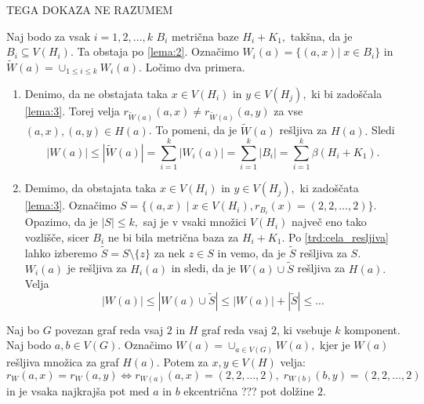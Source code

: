 \documentclass[mat1, tisk]{fmfdelo}
\newcommand{\1}{(1, 1, \ldots, 1)}
\newcommand{\2}{(2, 2, \ldots, 2)}
\begin{document}
TEGA DOKAZA NE RAZUMEM

\begin{dokaz}
    Naj bodo za vsak $i = 1, 2, \ldots, k$ $B_i$ metrična baze $H_i + K_1,$ takšna, da je $B_i \subseteq V(H_i).$ 
    Ta obstaja po \ref{lema:2}. Označimo $W_i(a) = \{(a,x) | \; x \in B_i\}$ in $\widetilde{W}(a) = \cup_{1 \leq i \leq k} W_i(a)$.
    Ločimo dva primera.
    \begin{enumerate}
        \item Denimo, da ne obstajata taka $x \in V(H_i)$ in $y\in V(H_j),$ ki bi zadoščala \ref{lema:3}.
        Torej velja $r_{\widetilde{W}(a)}(a, x) \neq r_{\widetilde{W}(a)}(a, y)$ za vse $(a, x), (a, y) \in H(a)$.
        To pomeni, da je $\widetilde{W}(a)$ rešljiva za $H(a).$ Sledi
        $$|W(a)| \leq |\widetilde{W}(a)| = \sum_{i = 1}^{k} |W_i(a)| = \sum_{i = 1}^{k} |B_i| = \sum_{i = 1}^{k} \beta(H_i + K_1).$$
        \item Demimo, da obstajata taka $x \in V(H_i)$ in $y\in V(H_j),$ ki zadoščata \ref{lema:3}.
        Označimo $S =\{(a, x) \; | \; x \in V(H_i), r_{B_i}(x) = \2 \}$. Opazimo, da je $|S| \leq k,$ saj je v vsaki množici $V(H_i)$
        največ eno tako vozlišče, sicer $B_i$ ne bi bila metrična baza za $H_i + K_1$. Po \ref{trd:cela_resljiva} lahko izberemo 
        $\widetilde{S} = S \setminus \{z\}$ za nek $z \in S$ in vemo, da je $\widetilde{S}$ rešljiva za $S$. $W_i(a)$ je rešljiva za $H_i(a)$
        in sledi, da je $W(a) \cup \widetilde{S}$ rešljiva za $H(a).$ Velja
        $$|W(a)| \leq |W(a) \cup \widetilde{S}| \leq |W(a)| + |\widetilde{S}|  \leq ...$$
        
    \end{enumerate}
\end{dokaz}


\begin{lema} \label{lema:5}
    Naj bo $G$ povezan graf reda vsaj $2$ in $H$ graf reda vsaj $2$, ki vsebuje $k$ komponent.
    Naj bodo $a, b \in V(G)$. Označimo $W(a) = \cup_{a \in V(G)} W(a),$ kjer je $W(a)$ rešljiva množica za graf 
    $H(a)$. Potem za $x, y \in V(H)$ velja:
    $$r_W(a, x) = r_W(a, y) \Leftrightarrow r_{W(a)}(a,x) = \2, \; r_{W(b)}(b,y) = \2$$ in je vsaka najkrajša pot med
    $a$ in $b$ ekcentrična ??? pot dolžine $2$.
\end{lema}
\end{document}
